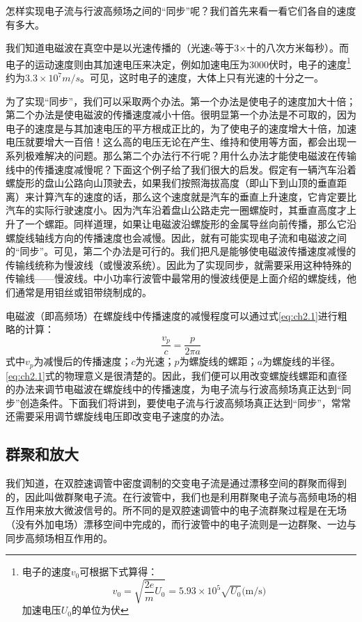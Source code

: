 怎样实现电子流与行波高频场之间的“同步”呢？我们首先来看一看它们各自的速度有多大。

我们知道电磁波在真空中是以光速传播的（光速c等于3×十的八次方米每秒）。而电子的运动速度则由其加速电压来决定，例如加速电压为3000伏时，电子的速度\footnote{电子的速度$ v_0 $可根据下式算得：\[v_0 = \sqrt{\frac{2e}{m}U_0} = 5.93\times10^5\sqrt{U_0}\textrm{(m/s)} \] 加速电压$ U_0 $的单位为伏}约为$ 3.3\times10^7m/s $。可见，这时电子的速度，大体上只有光速的十分之一。

为了实现“同步”，我们可以采取两个办法。第一个办法是使电子的速度加大十倍；第二个办法是使电磁波的传播速度减小十倍。很明显第一个办法是不可取的，因为电子的速度是与其加速电压的平方根成正比的，为了使电子的速度增大十倍，加速电压就要增大一百倍！这么高的电压无论在产生、维持和使用等方面，都会出现一系列极难解决的问题。那么第二个办法行不行呢？用什么办法才能使电磁波在传输线中的传播速度减慢呢？下面这个例子给了我们很大的启发。假定有一辆汽车沿着螺旋形的盘山公路向山顶驶去，如果我们按照海拔高度（即山下到山顶的垂直距离）来计算汽车的速度的话，那么这个速度就是汽车的垂直上升速度，它肯定要比汽车的实际行驶速度小。因为汽车沿着盘山公路走完一圈螺旋时，其垂直高度才上升了一个螺距。同样道理，如果让电磁波沿螺旋形的金属导丝向前传播，那么它沿螺旋线轴线方向的传播速度也会减慢。因此，就有可能实现电子流和电磁波之间的“同步”。可见，第二个办法是可行的。我们把凡是能够使电磁波传播速度减慢的传输线统称为慢波线（或慢波系统）。因此为了实现同步，就需要采用这种特殊的传输线——慢波线。中小功率行波管中最常用的慢波线便是上面介绍的螺旋线，他们通常是用钼丝或钼带绕制成的。

电磁波（即高频场）在螺旋线中传播速度的减慢程度可以通过式\ref{eq:ch2.1}进行粗略的计算：
\begin{equation} \label{eq:ch2.1}
	\dfrac{v_p}{c}=\dfrac{p}{2\pi a}
\end{equation}
式中$ v_p $为减慢后的传播速度；$ c $为光速；$ p $为螺旋线的螺距；$ a $为螺旋线的半径。\ref{eq:ch2.1}式的物理意义是很清楚的。因此，我们便可以用改变螺旋线螺距和直径的办法来调节电磁波在螺旋线中的传播速度，为电子流与行波高频场真正达到“同步”创造条件。下面我们将讲到，要使电子流与行波高频场真正达到“同步”，常常还需要采用调节螺旋线电压即改变电子速度的办法。
\subsection{群聚和放大}
我们知道，在双腔速调管中密度调制的交变电子流是通过漂移空间的群聚而得到的，因此叫做群聚电子流。在行波管中，我们也是利用群聚电子流与高频电场的相互作用来放大微波信号的。所不同的是双腔速调管中的电子流群聚过程是在无场（没有外加电场）漂移空间中完成的，而行波管中的电子流则是一边群聚、一边与同步高频场相互作用的。

